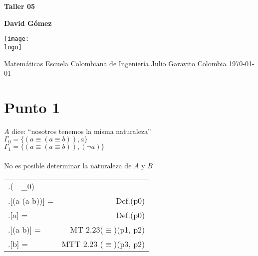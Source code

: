 \documentclass{article}
\newcommand{\logo}{C:/Users/usuario/Documents/U/logo-eci.jpg}
\newcommand{\q}[1]{``#1''}
\newcommand{\val}[2]{\mathbf{#1}[#2]}
\newcommand{\titlename}{Taller 05}%
\newlength{\logicv}
\newenvironment{logicenv}[2][0]{
  \begin{tcolorbox}[demo, title = #2]
  \vspace*{#1\logicv}
}{
  \end{tcolorbox}
  \vspace*{-.5cm}
}
\newenvironment{subproofill}[1][0]{
  \begin{tcolorbox}[demo, title = ]
    \vspace*{-#1\logicv}
}{
  \end{tcolorbox}
  \vspace*{-.5cm}
}
\newenvironment{subproof}[2][0]{
  \begin{tcolorbox}[demo, title = #2, colframe = black]
  \vspace*{#1\logicv}
  \begin{logic}
}{
  \end{logic}
  \end{tcolorbox}
}
\newenvironment{logic}{
    \setlength{\extrarowheight}{3pt}
    \setcounter{row}{-1}
    \begin{center}
    \begin{NiceTabular}{>{\stepcounter{row}\therow.\hspace*{5pt}} L r }
}{
    \end{NiceTabular}
    \end{center}
}
\begin{document}

\begin{titlepage}
    \begin{center}
        \vspace*{1cm}

        \textbf{\Huge{\titlename}}

        \vspace{1.5cm}

        \textbf{\large{David Gómez}}

        \vspace{4cm}

        \texttt{[image: \\logo]}

        \vspace{5cm}

        Matemáticas\linebreak
        Escuela Colombiana de Ingeniería Julio Garavito\linebreak
        Colombia\linebreak
        \today

    \end{center}
\end{titlepage}
\clearpage
\tableofcontents
\clearpage

\section{Punto 1}

\begin{logicenv}[5]{Punto 1{ , ($A$ , $B$)}}
    $A$ dice: \q{nosotros tenemos la misma naturaleza}\\
    $\Gamma_0 = \{(a \equiv (a \equiv b)), a\}$\\
    $\Gamma_1 = \{(a \equiv (a \equiv b)), (\neg a)\}$\\
    \makebox[8cm]{\hrulefill}\\
    No es posible determinar la naturaleza de $A$ y $B$
\end{logicenv}
\begin{subproofill}
  \begin{subproof}{Con $\Gamma_0$}
    (\exists {}\, \vert\,   \Gamma_0)\\
    \val{v}{(a \equiv (a \equiv b))} =  & Def.(p0)\\
    \val{v}{a} =  & Def.(p0)\\
    \val{v}{(a \equiv b)} =  & MT 2.23($\equiv$)(p1, p2)\\
    \val{v}{b} =  & MTT 2.23 ($\equiv$)(p3, p2)
  \end{subproof}
\end{subproofill}
\end{document}
